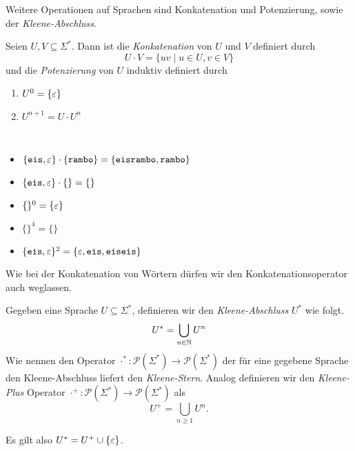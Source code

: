 Weitere Operationen auf Sprachen sind Konkatenation und Potenzierung, sowie der \emph{Kleene-Abschluss}.
\begin{Def} %
	Seien $U,V\subseteq \Sigma^*$. Dann ist die \emph{Konkatenation} von $U$ und $V$ definiert durch
	\[ U\cdot V = \{uv \mid u\in U, v\in V \} \]
  und die \emph{Potenzierung} von $U$ induktiv definiert durch
  \begin{enumerate}
  \item $U^0 = \{\varepsilon\}$
  \item $U^{n+1} = U \cdot U^{n}$
  \qedhere
  \end{enumerate}
\end{Def}
\begin{Bsp*}~
  \begin{itemize}
  \item $\{\mathtt{eis}, \varepsilon\} \cdot \{\mathtt{rambo}\} = \{\mathtt{eisrambo}, \mathtt{rambo}\}$
  \item $\{\mathtt{eis}, \varepsilon\} \cdot \{\} = \{\}$
  \item $\{\}^0 = \{\varepsilon\}$
  \item $\{\}^4 = \{\}$
  \item $\{\mathtt{eis}, \varepsilon\}^2 = \{\varepsilon, \mathtt{eis}, \mathtt{eiseis}\}$
  \qedhere
  \end{itemize}
\end{Bsp*}
Wie bei der Konkatenation von Wörtern dürfen wir den Konkatenationsoperator auch weglassen.
%
\begin{Def}
  Gegeben eine Sprache $U\subseteq\Sigma^*$, definieren wir den \emph{Kleene-Abschluss} $U^*$ wie folgt.
      $$U^* = \bigcup_{n\in\mathbb{N}} U^n$$
  Wie nennen den Operator $\cdot^*: \mathcal{P}(\Sigma^*)\rightarrow\mathcal{P}(\Sigma^*)$ der für eine gegebene Sprache den Kleene-Abschluss liefert den \emph{Kleene-Stern}. Analog definieren wir den \emph{Kleene-Plus} Operator $\cdot^+: \mathcal{P}(\Sigma^*)\rightarrow\mathcal{P}(\Sigma^*)$ als 
  $$U^+ = \bigcup_{n\ge1} U^n.$$
\end{Def}
Es gilt also $U^*=U^+\cup\{\varepsilon\}$.


